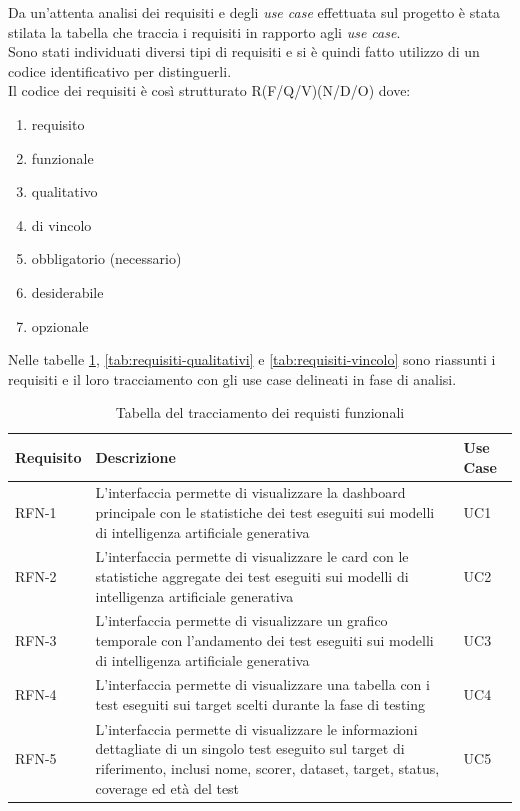 Da un'attenta analisi dei requisiti e degli \emph{use case} effettuata sul progetto è stata stilata la tabella che traccia i requisiti in rapporto agli \emph{use case}.\\
Sono stati individuati diversi tipi di requisiti e si è quindi fatto utilizzo di un codice identificativo per distinguerli.\\
Il codice dei requisiti è così strutturato R(F/Q/V)(N/D/O) dove:
\begin{enumerate}
	\item[R =] requisito
    \item[F =] funzionale
    \item[Q =] qualitativo
    \item[V =] di vincolo
    \item[N =] obbligatorio (necessario)
    \item[D =] desiderabile
    \item[O =] opzionale
\end{enumerate}
Nelle tabelle \ref{tab:requisiti-funzionali}, \ref{tab:requisiti-qualitativi} e \ref{tab:requisiti-vincolo} sono riassunti i requisiti e il loro tracciamento con gli use case delineati in fase di analisi.

\newpage

\begin{table}%
\caption{Tabella del tracciamento dei requisti funzionali}
\label{tab:requisiti-funzionali}
\begin{tabularx}{\textwidth}{lXl}
\hline\hline
\textbf{Requisito} & \textbf{Descrizione} & \textbf{Use Case}\\
\hline
RFN-1 & L'interfaccia permette di visualizzare la dashboard principale con le statistiche dei test eseguiti sui modelli di intelligenza artificiale generativa & UC1 \\
\hline
RFN-2 & L'interfaccia permette di visualizzare le card con le statistiche aggregate dei test eseguiti sui modelli di intelligenza artificiale generativa & UC2 \\
\hline
RFN-3 & L'interfaccia permette di visualizzare un grafico temporale con l'andamento dei test eseguiti sui modelli di intelligenza artificiale generativa & UC3 \\
\hline
RFN-4 & L'interfaccia permette di visualizzare una tabella con i test eseguiti sui target scelti durante la fase di testing & UC4 \\
\hline
RFN-5 & L'interfaccia permette di visualizzare le informazioni dettagliate di un singolo test eseguito sul target di riferimento, inclusi nome, scorer, dataset, target, status, coverage ed età del test & UC5 \\
\hline
\end{tabularx}
\end{table}%

